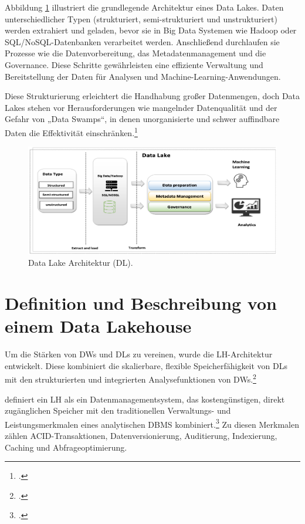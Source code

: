 Abbildung \ref{fig:DataLake-Architecture} illustriert die grundlegende Architektur eines Data Lakes. Daten unterschiedlicher Typen (strukturiert, semi-strukturiert und unstrukturiert) werden extrahiert und geladen, bevor sie in Big Data Systemen wie Hadoop oder SQL/NoSQL-Datenbanken verarbeitet werden. Anschließend durchlaufen sie Prozesse wie die Datenvorbereitung, das Metadatenmanagement und die Governance. Diese Schritte gewährleisten eine effiziente Verwaltung und Bereitstellung der Daten für Analysen und Machine-Learning-Anwendungen.

Diese Strukturierung erleichtert die Handhabung großer Datenmengen, doch Data Lakes stehen vor Herausforderungen wie mangelnder Datenqualität und der Gefahr von „Data Swamps“, in denen unorganisierte und schwer auffindbare Daten die Effektivität einschränken.\footcite[Vgl.][S. 46 ff.]{inmonDataLakeArchitecture2016} 

\begin{figure}[H]\label{fig:DataLake-Architecture}
    \centering
    \includegraphics[width=0.7\linewidth]{graphics/dl-architecture.png}
    \caption[Data Lake Architektur]{Data Lake Architektur (DL).\footnotemark}
    \label{fig:DataLake-Architecture}
    \end{figure}

\section{Definition und Beschreibung von einem Data Lakehouse}
Um die Stärken von \ac{DW}s und \ac{DL}s zu vereinen, wurde die \ac{LH}-Architektur entwickelt. Diese kombiniert die skalierbare, flexible Speicherfähigkeit von \ac{DL}s mit den strukturierten und integrierten Analysefunktionen von \ac{DW}s.\footcite[Vgl.][S. 391]{10020719}

\cite{armbrustLakehouseNewGeneration2021} definiert ein \ac{LH} als ein Datenmanagementsystem, das kostengünstigen, direkt zugänglichen Speicher mit den traditionellen Verwaltungs- und Leistungsmerkmalen eines analytischen \ac{DBMS} kombiniert.\footcite[Vgl.][S. 3]{armbrustLakehouseNewGeneration2021} 
Zu diesen Merkmalen zählen \ac{ACID}-Transaktionen, Datenversionierung, Auditierung, Indexierung, Caching und Abfrageoptimierung.

